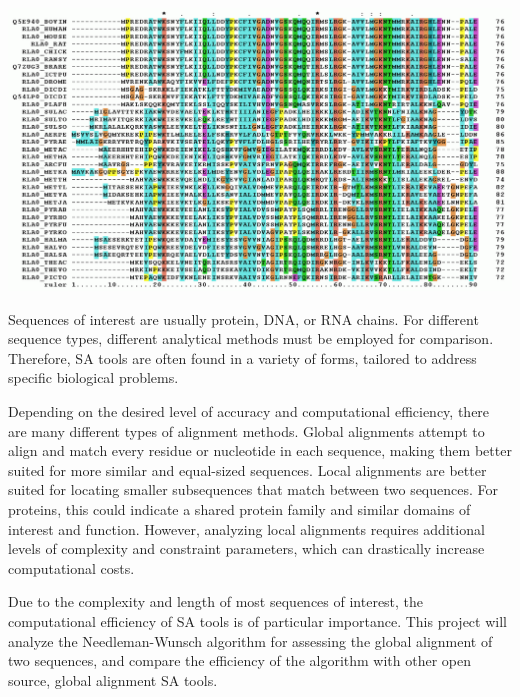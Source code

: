 \documentclass{article}
\begin{document}
\begin{center}
    \includegraphics[scale=0.35]{multiple_alignment}
    \label{fig:ma}
\end{center}

Sequences of interest are usually protein, DNA, or RNA chains.  For different
sequence types, different analytical methods must be employed for comparison.
Therefore, SA tools are often found in a variety of forms, tailored to address
specific biological problems. \cite{rosenburg}

Depending on the desired level of accuracy and computational efficiency, there
are many different types of alignment methods. 
Global alignments attempt to align and match every residue or nucleotide in each
sequence, making them better suited for more similar and equal-sized sequences.
Local alignments are better suited for locating smaller subsequences that match
between two sequences. For proteins, this could indicate a shared protein family
and similar domains of interest and function. 
However, analyzing local alignments requires additional levels of complexity and
constraint parameters, which can drastically increase computational costs. \cite{nguyen} 

Due to the complexity and length of most sequences of interest, the
computational efficiency of SA tools is of particular importance.  This project
will analyze the Needleman-Wunsch algorithm for assessing the global alignment
of two sequences, and compare the efficiency of the algorithm with other open
source, global alignment SA tools.
\end{document}
